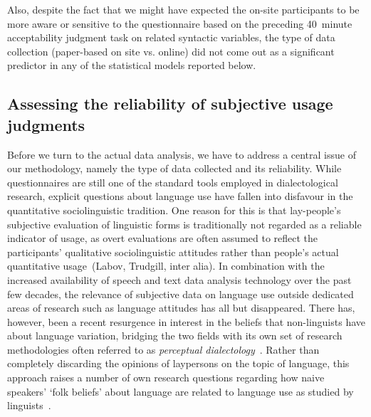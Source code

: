Also, despite the fact that we might have expected the on-site participants to be more aware or sensitive to the questionnaire based on the preceding 40~minute acceptability judgment task on related syntactic variables, the type of data collection (paper-based on site vs. online) did not come out as a significant predictor in any of the statistical models reported below.


\subsection{Assessing the reliability of subjective usage judgments}\label{sec:judgmentcorrelation}

Before we turn to the actual data analysis, we have to address a central issue of our methodology, namely the type of data collected and its reliability. While questionnaires are still one of the standard tools employed in dialectological research, explicit questions about language use have fallen into disfavour in the quantitative sociolinguistic tradition. One reason for this is that lay-people's subjective evaluation of linguistic forms is traditionally not regarded as a reliable indicator of usage, as overt evaluations are often assumed to reflect the participants' qualitative sociolinguistic attitudes rather than people's actual quantitative usage~(Labov, Trudgill, inter alia).
In combination with the increased availability of speech and text data analysis technology over the past few decades, the relevance of subjective data on language use outside dedicated areas of research such as language attitudes has all but disappeared.
There has, however, been a recent resurgence in interest in the beliefs that non-linguists have about language variation, bridging the two fields with its own set of research methodologies often referred to as \emph{perceptual dialectology}~\citep{Montgomery2011}. %
Rather than completely discarding the opinions of laypersons on the topic of language, this approach raises a number of own research questions regarding how naive speakers' `folk beliefs' about language are related to language use as studied by linguists~\citep{Preston1996}.

